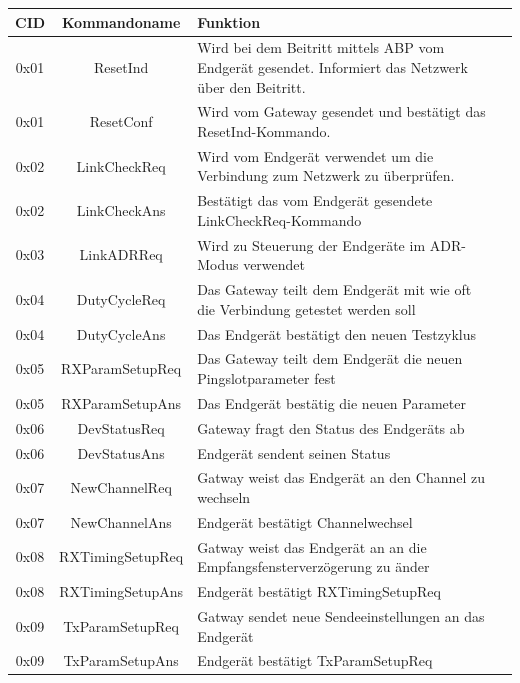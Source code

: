 \documentclass[a4paper, 12pt]{article}
\begin{document}
                    
                \begin{longtable}{c |c | p{10.5cm} c}
                    CID & Kommandoname & Funktion \\
                    \hline
                    0x01 & ResetInd & Wird bei dem Beitritt mittels ABP vom Endgerät gesendet. Informiert das Netzwerk über den Beitritt. \\
                    0x01 & ResetConf & Wird vom Gateway gesendet und bestätigt das ResetInd-Kommando. \\
                    0x02 & LinkCheckReq & Wird vom Endgerät verwendet um die Verbindung zum Netzwerk zu überprüfen. \\
                    0x02 & LinkCheckAns & Bestätigt das vom Endgerät gesendete LinkCheckReq-Kommando \\
                    0x03 & LinkADRReq & Wird zu Steuerung der Endgeräte im ADR-Modus verwendet \\
                    0x04 & DutyCycleReq & Das Gateway teilt dem Endgerät mit wie oft die Verbindung getestet werden soll \\
                    0x04 & DutyCycleAns & Das Endgerät bestätigt den neuen Testzyklus \\
                    0x05 & RXParamSetupReq & Das Gateway teilt dem Endgerät die neuen Pingslotparameter fest \\
                    0x05 & RXParamSetupAns & Das Endgerät bestätig die neuen Parameter \\
                    0x06 & DevStatusReq & Gateway fragt den Status des Endgeräts ab \\
                    0x06 & DevStatusAns & Endgerät sendent seinen Status \\
                    0x07 & NewChannelReq & Gatway weist das Endgerät an den Channel zu wechseln \\
                    0x07 & NewChannelAns & Endgerät bestätigt Channelwechsel \\
                    0x08 & RXTimingSetupReq & Gatway weist das Endgerät an an die Empfangsfensterverzögerung zu änder \\
                    0x08 & RXTimingSetupAns & Endgerät bestätigt RXTimingSetupReq \\
                    0x09 & TxParamSetupReq & Gatway sendet neue Sendeeinstellungen an das Endgerät \\
                    0x09 & TxParamSetupAns & Endgerät bestätigt TxParamSetupReq \\

\end{longtable}
\end{document}
